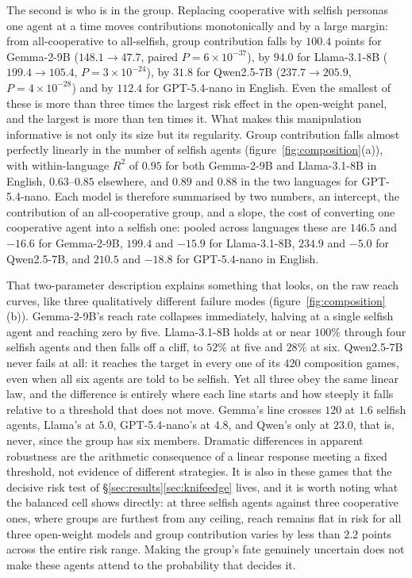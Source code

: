 \documentclass[openacc]{rsproca_new}
\begin{document}
The second is who is in the group. Replacing cooperative with selfish personas one agent at a time moves contributions monotonically and by a large margin: from all-cooperative to all-selfish, group contribution falls by $100.4$ points for Gemma-2-9B ($148.1\to47.7$, paired $P=6\times10^{-37}$), by $94.0$ for Llama-3.1-8B ($199.4\to105.4$, $P=3\times10^{-24}$), by $31.8$ for Qwen2.5-7B ($237.7\to205.9$, $P=4\times10^{-28}$) and by $112.4$ for GPT-5.4-nano in English. Even the smallest of these is more than three times the largest risk effect in the open-weight panel, and the largest is more than ten times it. What makes this manipulation informative is not only its size but its regularity. Group contribution falls almost perfectly linearly in the number of selfish agents (figure~\ref{fig:composition}(a)), with within-language $R^2$ of $0.95$ for both Gemma-2-9B and Llama-3.1-8B in English, $0.63$--$0.85$ elsewhere, and $0.89$ and $0.88$ in the two languages for GPT-5.4-nano. Each model is therefore summarised by two numbers, an intercept, the contribution of an all-cooperative group, and a slope, the cost of converting one cooperative agent into a selfish one: pooled across languages these are $146.5$ and $-16.6$ for Gemma-2-9B, $199.4$ and $-15.9$ for Llama-3.1-8B, $234.9$ and $-5.0$ for Qwen2.5-7B, and $210.5$ and $-18.8$ for GPT-5.4-nano in English.

That two-parameter description explains something that looks, on the raw reach curves, like three qualitatively different failure modes (figure~\ref{fig:composition}(b)). Gemma-2-9B's reach rate collapses immediately, halving at a single selfish agent and reaching zero by five. Llama-3.1-8B holds at or near $100\%$ through four selfish agents and then falls off a cliff, to $52\%$ at five and $28\%$ at six. Qwen2.5-7B never fails at all: it reaches the target in every one of its $420$ composition games, even when all six agents are told to be selfish. Yet all three obey the same linear law, and the difference is entirely where each line starts and how steeply it falls relative to a threshold that does not move. Gemma's line crosses $120$ at $1.6$ selfish agents, Llama's at $5.0$, GPT-5.4-nano's at $4.8$, and Qwen's only at $23.0$, that is, never, since the group has six members. Dramatic differences in apparent robustness are the arithmetic consequence of a linear response meeting a fixed threshold, not evidence of different strategies. It is also in these games that the decisive risk test of \S\ref{sec:results}\ref{sec:knifeedge} lives, and it is worth noting what the balanced cell shows directly: at three selfish agents against three cooperative ones, where groups are furthest from any ceiling, reach remains flat in risk for all three open-weight models and group contribution varies by less than $2.2$ points across the entire risk range. Making the group's fate genuinely uncertain does not make these agents attend to the probability that decides it.
\end{document}
